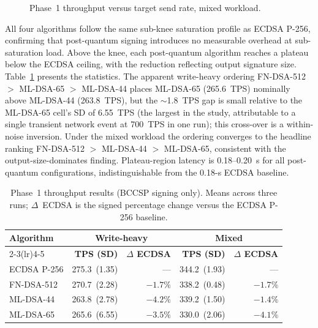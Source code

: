 \documentclass{ieeetj}
\begin{document}
\begin{figure}[ht]
\centering

\caption{Phase~1 throughput versus target send rate, mixed workload.}
\label{fig:phase1_mixed}
\end{figure}

All four algorithms follow the same sub-knee saturation profile as ECDSA P-256,
confirming that post-quantum signing introduces no measurable overhead at
sub-saturation load. Above the knee, each post-quantum algorithm reaches a
plateau below the ECDSA ceiling, with the reduction reflecting output signature
size. Table~\ref{tab:phase1_results} presents the statistics. The apparent
write-heavy ordering FN-DSA-512 $>$ ML-DSA-65 $>$ ML-DSA-44 places ML-DSA-65
(265.6~TPS) nominally above ML-DSA-44 (263.8~TPS), but the $\sim$1.8~TPS gap is
small relative to the ML-DSA-65 cell's SD of 6.55~TPS (the largest in the study,
attributable to a single transient network event at 700~TPS in one run); this
cross-over is a within-noise inversion. Under the mixed workload the ordering
converges to the headline ranking FN-DSA-512 $>$ ML-DSA-44 $>$ ML-DSA-65,
consistent with the output-size-dominates finding. Plateau-region latency is
0.18--0.20~s for all post-quantum configurations, indistinguishable from the
0.18-s ECDSA baseline.

\begin{table}[ht]
\centering
\caption{Phase~1 throughput results (BCCSP signing only). Means across three
runs; $\Delta$~ECDSA is the signed percentage change versus the ECDSA P-256
baseline.}
\label{tab:phase1_results}
\begin{tabular}{@{}lrrrr@{}}
\toprule
\textbf{Algorithm} &
\multicolumn{2}{c}{\textbf{Write-heavy}} &
\multicolumn{2}{c}{\textbf{Mixed}} \\
\cmidrule(lr){2-3}\cmidrule(lr){4-5}
& \textbf{TPS (SD)} & \textbf{$\Delta$ ECDSA} &
  \textbf{TPS (SD)} & \textbf{$\Delta$ ECDSA} \\
\midrule
ECDSA P-256 & 275.3~(1.35) & — & 344.2~(1.93) & — \\
FN-DSA-512  & 270.7~(2.28) & $-1.7\%$ & 338.2~(0.48) & $-1.7\%$ \\
ML-DSA-44   & 263.8~(2.78) & $-4.2\%$ & 339.2~(1.50) & $-1.4\%$ \\
ML-DSA-65   & 265.6~(6.55) & $-3.5\%$ & 330.0~(2.06) & $-4.1\%$ \\
\bottomrule
\end{tabular}
\end{table}
\end{document}
